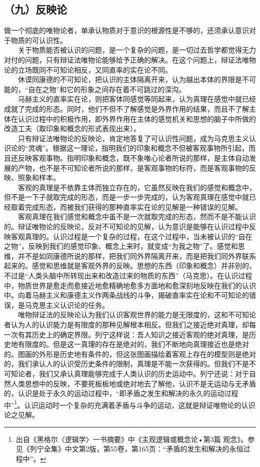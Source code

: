 \documentclass[cn,11pt,chinese]{elegantbook}
\def\myformat#1{\hfil\hfil #1}
\begin{document}
\subsection*{\myformat{（九）反映论}}
做一个彻底的唯物论者，单承认物质对于意识的根源性是不够的，还须承认意识对于物质的可认识性。\\
　　关于物质能否被认识的问题，是一个复杂的问题，是一切过去哲学都觉得无力对付的问题，只有辩证法唯物论能够给予正确的解决。在这个问题上，辩证法唯物论的立场既同不可知论相反，又同直率的实在论不同。\\
　　休谟同康德的不可知论，把认识的主体隔离开来，认为越出本体的界限是不可能的，“自在之物”和它的形象之间存在着不可跳过的深沟。\\
　　马赫主义的直率实在论，则把客体同感觉等同起来，认为真理在感觉中就已经成就了完成的形态。同时，他们不但不了解感觉是外界作用的结果，而且不了解主体在认识过程中的积极作用，即外界作用在主体的感觉机关和思想的脑子中所做的改造工夫（取印象和概念的形式表现出来）。\\
　　只有辩证法唯物论的反映论，肯定地答复了可认识性问题，成为马克思主义认识论的“灵魂”。根据这一理论，指明我们的印象和概念不但被客观事物所引起，而且还反映客观事物。指明印象和概念，既不象唯心论者所说的那样，是主体自动发展的产物，也不是不可知论者所说的那样，是客观事物的标符，而是客观事物的反映、照象和样本。\\
　　客观的真理是不依靠主体而独立存在的，它虽然反映在我们的感觉和概念中，但不是一下子就取完成的形态，而是一步一步完成的，认为客观真理在感觉中就已经取着完成形态，而被我们获得的那种直率实在论的见解是一种错误的见解。\\
　　客观真理在我们感觉和概念中虽不是一次就取完成的形态，然而不是不能认识的。辩证唯物论的反映论，反对不可知论的见解，认为意识是能够在认识过程中反映客观真理的。认识过程是一个复杂的过程，在这个过程中，当未被认识的“自在之物”，反映到我们的感觉印象、概念上来时，就变成“为我之物”了。感觉和思维，并不是如同康德所说的那样，把我们同外界隔离开来，而是把我们同外界联系起来的。感觉和思维就是客观外界的反映。思想的东西（印象和概念）并非别的，不过是“人类头脑中所转现出来和改造过来的物质的东西”（马克思）。在认识过程中，物质世界是愈走而愈接近地愈精确地愈多方面地和愈深刻地反映在我们的认识中。向着马赫主义和康德主义作两条战线的斗争，揭破直率实在论和不可知论的错误，是马克思主义认识论的任务。\\
　　唯物辩证法的反映论认为我们认识客观世界的能力是无限度的，这和不可知论者认为人的认识能力是有限度的那种见解根本相反。但我们之接近绝对真理，却每一次有其历史上的确定界限。列宁这样说：吾人知识之接近客观的绝对真理，是历史地有限度的。但是这一真理的存在是绝对的，我们不断地向真理接近也是绝对的。图画的外形是历史地有条件的，但这张图画描绘着客观上存在的模型则是绝对的，我们承认人的认识受历史条件的限制，真理是不能一次获得的。但我们不是不可知论者，我们又承认真理能够完成于人类认识的历史运动中。列宁还说：对于自然人类思想中的反映，不要死板板地或绝对地去了解他，认识不是无运动与无矛盾的，认识是处于永久的运动过程中，“即矛盾之发生和解决的永久的运动过程中”\footnote[16]{ 出自《黑格尔〈逻辑学〉一书摘要》中《主观逻辑或概念论•第3篇 观念》。参见《列宁全集》中文第2版，第55卷，第165页：“矛盾的发生和解决的永恒过程中”。}。认识运动时一个复杂的充满着矛盾与斗争的运动，这就是辩证唯物论的认识论之见解。\\
\end{document}
